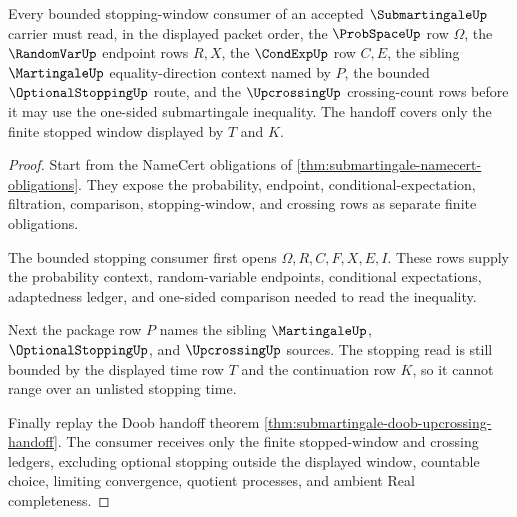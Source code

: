 \begin{theorem}
\label{thm:submartingale-stopping-window-handoff}
Every bounded stopping-window consumer of an accepted $\SubmartingaleUp$ carrier must read, in the displayed packet order, the $\ProbSpaceUp$ row $\Omega$, the $\RandomVarUp$ endpoint rows $R,X$, the $\CondExpUp$ row $C,E$, the sibling $\MartingaleUp$ equality-direction context named by $P$, the bounded $\OptionalStoppingUp$ route, and the $\UpcrossingUp$ crossing-count rows before it may use the one-sided submartingale inequality. The handoff covers only the finite stopped window displayed by $T$ and $K$.
\end{theorem}
\begin{proof}
Start from the NameCert obligations of \autoref{thm:submartingale-namecert-obligations}. They expose the probability, endpoint, conditional-expectation, filtration, comparison, stopping-window, and crossing rows as separate finite obligations.

The bounded stopping consumer first opens $\Omega,R,C,F,X,E,I$. These rows supply the probability context, random-variable endpoints, conditional expectations, adaptedness ledger, and one-sided comparison needed to read the inequality.

Next the package row $P$ names the sibling $\MartingaleUp$, $\OptionalStoppingUp$, and $\UpcrossingUp$ sources. The stopping read is still bounded by the displayed time row $T$ and the continuation row $K$, so it cannot range over an unlisted stopping time.

Finally replay the Doob handoff theorem \autoref{thm:submartingale-doob-upcrossing-handoff}. The consumer receives only the finite stopped-window and crossing ledgers, excluding optional stopping outside the displayed window, countable choice, limiting convergence, quotient processes, and ambient Real completeness.
\end{proof}

